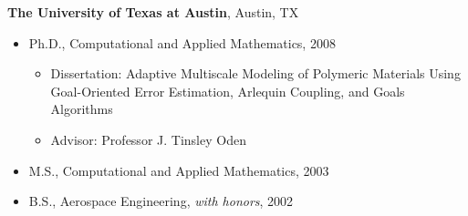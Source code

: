 %
\textbf{The University of Texas at Austin}, 
Austin, TX
\begin{itemize}

\item Ph.D., 
        Computational and Applied Mathematics, 2008 
        \begin{itemize}
        \item Dissertation: Adaptive Multiscale Modeling of Polymeric Materials Using Goal-Oriented
        Error Estimation, Arlequin Coupling, and Goals Algorithms
        \item Advisor: Professor J. Tinsley Oden
        \end{itemize}

\item M.S., 
        Computational and Applied Mathematics, 2003 

\item B.S., 
        Aerospace Engineering, \emph{with honors}, 2002

\end{itemize}

